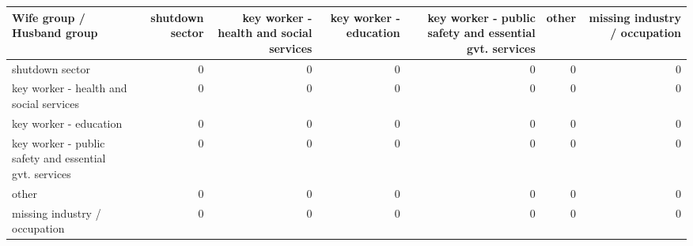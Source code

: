 
\begin{tabular}{lrrrrrr}
\toprule
Wife group / Husband group & shutdown sector & key worker - health
 and social services & key worker - education & key worker - public safety
 and essential gvt. services & other & missing industry / occupation\\
\midrule
shutdown sector & 0 & 0 & 0 & 0 & 0 & 0\\
key worker - health
 and social services & 0 & 0 & 0 & 0 & 0 & 0\\
key worker - education & 0 & 0 & 0 & 0 & 0 & 0\\
key worker - public safety
 and essential gvt. services & 0 & 0 & 0 & 0 & 0 & 0\\
other & 0 & 0 & 0 & 0 & 0 & 0\\
missing industry / occupation & 0 & 0 & 0 & 0 & 0 & 0\\
\bottomrule
\end{tabular}
